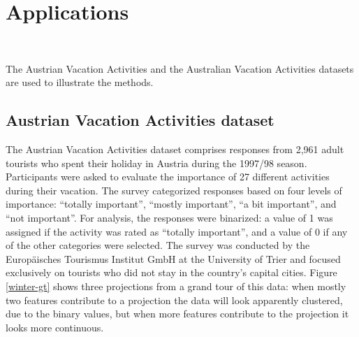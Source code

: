 \documentclass[article]{ajs}
\begin{document}
\section{Applications}~\label{applications}

The Austrian Vacation Activities \citep{dolnicar2003winter} and the Australian Vacation Activities \cite{cliff2009formative} datasets are used to illustrate the methods.

\subsection{Austrian Vacation Activities dataset}

The Austrian Vacation Activities dataset comprises responses from 2,961 adult tourists who spent their holiday in Austria during the 1997/98 season. Participants were asked to evaluate the importance of 27 different activities during their vacation. The survey categorized responses based on four levels of importance: ``totally important'', ``mostly important'', ``a bit important'', and ``not important''. For analysis, the responses were binarized: a value of 1 was assigned if the activity was rated as ``totally important'', and a value of 0 if any of the other categories were selected. The survey was conducted by the Europäisches Tourismus Institut GmbH at the University of Trier and focused exclusively on tourists who did not stay in the country's capital cities. Figure \ref{winter-gt} shows three projections from a grand tour of this data: when mostly two features contribute to a projection the data will look apparently clustered, due to the binary values, but when more features contribute to the projection it looks more continuous. 
\end{document}
